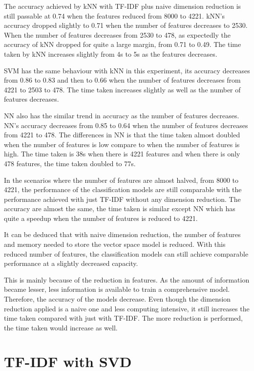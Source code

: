 The accuracy achieved by kNN with TF-IDF plus naive dimension reduction is still passable at 0.74 when the features reduced from 8000 to 4221. kNN's accuracy dropped slightly to 0.71 when the number of features decreases to 2530. When the number of features decreases from 2530 to 478, as expectedly the accuracy of kNN dropped for quite a large margin, from 0.71 to 0.49. The time taken by kNN increases slightly from 4s to 5s as the features decreases.

SVM has the same behaviour with kNN in this experiment, its accuracy decreases from 0.86 to 0.83 and then to 0.66 when the number of features decreases from 4221 to 2503 to 478. The time taken increases slightly as well as the number of features decreases.

NN also has the similar trend in accuracy as the number of features decreases. NN's accuracy decreases from 0.85 to 0.64 when the number of features decreases from 4221 to 478. The differences in NN is that the time taken almost doubled when the number of features is low compare to when the number of features is high. The time taken is 38s when there is 4221 features and when there is only 478 features, the time taken doubled to 77s.

In the scenarios where the number of features are almost halved, from 8000 to 4221, the performance of the classification models are still comparable with the performance achieved with just TF-IDF without any dimension reduction. The accuracy are almost the same, the time taken is similar except NN which has quite a speedup when the number of features is reduced to 4221.

It can be deduced that with naive dimension reduction, the number of features and memory needed to store the vector space model is reduced. With this reduced number of features, the classification models can still achieve comparable performance at a slightly decreased capacity.

This is mainly because of the reduction in features. As the amount of information became lesser, less information is available to train a comprehensive model. Therefore, the accuracy of the models decrease. Even though the dimension reduction applied is a naive one and less computing intensive, it still increases the time taken compared with just with TF-IDF. The more reduction is performed, the time taken would increase as well.

\clearpage
\section{TF-IDF with SVD}

